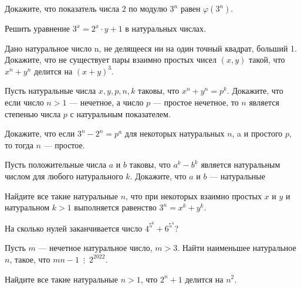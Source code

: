 \documentclass{article}
\begin{document}
\begin{enumerate_boxed}
        \item Докажите, что показатель числа 2 по модулю $3^n$ равен $\varphi(3^n)$.
        \item Решить уравнение $3^x = 2^x \cdot y + 1$ в натуральных числах.
        \item Дано натуральное число n, не делящееся ни на один точный квадрат, больший 1.
        Докажите, что не существует пары взаимно простых чисел $(x, y)$ такой, что $x^n + y^n$ делится на $(x + y)^3$.
        \item Пусть натуральные числа $x, y, p, n, k$ таковы, что $x^n +y^n = p^k$.
        Докажите, что если число $n > 1$ — нечетное, а число $p$ — простое нечетное, то $n$ является степенью числа $p$ с натуральным показателем.
        \item Докажите, что если $3^n - 2^n = p^a$ для некоторых натуральных $n$, a и простого $p$, то тогда $n$ — простое.
        \item Пусть положительные числа $a$ и $b$ таковы, что $a^k - b^k$ является натуральным числом для любого натурального $k$.
        Докажите, что $a$ и $b$ — натуральные
        \item Найдите все такие натуральные $n$, что при некоторых взаимно простых $x$ и $y$ и натуральном $k > 1$ выполняется равенство $3^n = x^k + y^k$.
        \item На сколько нулей заканчивается число $4^{5^6} + 6^{5^4}$?
        \item Пусть $m$ — нечетное натуральное число, $m > 3$.
        Найти наименьшее натуральное $n$, такое, что $mn - 1 \,\,\,\vdots\,\,\,2^{2022}$.
        \item Найдите все такие натуральные $n > 1$, что $2^n + 1$ делится на $n^2$.

    \end{enumerate_boxed}
\end{document}
